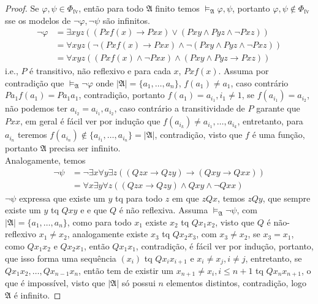 \documentclass[11pt]{article}
\newcommand{\mf}[1]{\mathfrak{#1}}
\begin{document}
\begin{proof}
    Se $\varphi,\psi\in\Phi_\text{fv}$, então para todo $\mf{A}$ finito temos $\vDash_\mf{A}\varphi,\psi$, portanto $\varphi,\psi\notin\Phi_\text{fv}$ sse os modelos de $\neg\varphi,\neg\psi$ são infinitos.
    \begin{align*}
        \neg\varphi & = \exists xyz((Pxf(x)\to Pxx)\vee(Pxy\wedge Pyz\wedge\neg Pxz))\\
        & = \forall xyz(\neg(Pxf(x)\to Pxx)\wedge\neg(Pxy\wedge Pyz\wedge\neg Pxz))\\
        & = \forall xyz((Pxf(x)\wedge\neg Pxx)\wedge(Pxy\wedge Pyz\to Pxz))
    \end{align*}
    i.e., $P$ é transitivo, não reflexivo e para cada $x$, $Pxf(x)$. Assuma por contradição que $\vDash_\mf{A}\neg\varphi$ onde $|\mf{A}|=\{a_1,\dots,a_n\}$, $f(a_1)\neq a_1$, caso contrário $Pa_1f(a_1)=Pa_1a_1$, contradição, portanto $f(a_1)=a_{i_1},i_1\neq1$, se $f(a_{i_1})=a_{i_2}$, não podemos ter $a_{i_2}=a_{i_1},a_{i_2}$, caso contrário a transitividade de $P$ garante que $Pxx$, em geral é fácil ver por indução que $f(a_{i_k})\neq a_{i_1},\dots,a_{i_k}$, entretanto, para $a_{i_n}$ teremos $f(a_{i_n})\notin\{a_{i_1},\dots,a_{i_n}\}=|\mf{A}|$, contradição, visto que $f$ é uma função, portanto $\mf{A}$ precisa ser infinito.\\
    Analogamente, temos
    \begin{align*}
        \neg\psi & = \neg\exists x\forall y\exists z((Qzx\to Qzy)\to(Qxy\to Qxx))\\
        & = \forall x\exists y\forall z((Qzx\to Qzy)\wedge Qxy\wedge\neg Qxx)
    \end{align*}
    $\neg\psi$ expressa que existe um $y$ tq para todo $z$ em que $zQx$, temos $zQy$, que sempre existe um $y$ tq $Qxy$ e e que $Q$ é não reflexiva. Assuma $\vDash_\mf{A}\neg\psi$, com $|\mf{A}|=\{a_1,\dots,a_n\}$, como para todo $x_1$ existe $x_2$ tq $Qx_1x_2$, visto que $Q$ é não-reflexivo $x_1\neq x_2$, analogamente existe $x_3$ tq $Qx_2x_3$, com $x_3\neq x_2$, se $x_3=x_1$, como $Qx_1x_2$ e $Qx_2x_1$, então $Qx_1x_1$, contradição, é fácil ver por indução, portanto, que isso forma uma sequência $(x_i)$ tq $Qx_ix_{i+1}$ e $x_i\neq x_j,i\neq j$, entretanto, se $Qx_1x_2,\dots,Qx_{n-1}x_n$, então tem de existir um $x_{n+1}\neq x_i,i\leq n+1$ tq $Qx_nx_{n+1}$, o que é impossível, visto que $|\mf{A}|$ só possui $n$ elementos distintos, contradição, logo $\mf{A}$ é infinito.
\end{proof}
\end{document}
